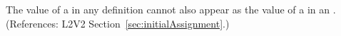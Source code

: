 The value of a   in any \InitialAssignment definition
cannot also appear as the value of a   in an
\AssignmentRule.  (References: L2V2 Section~\ref{sec:initialAssignment}.)
